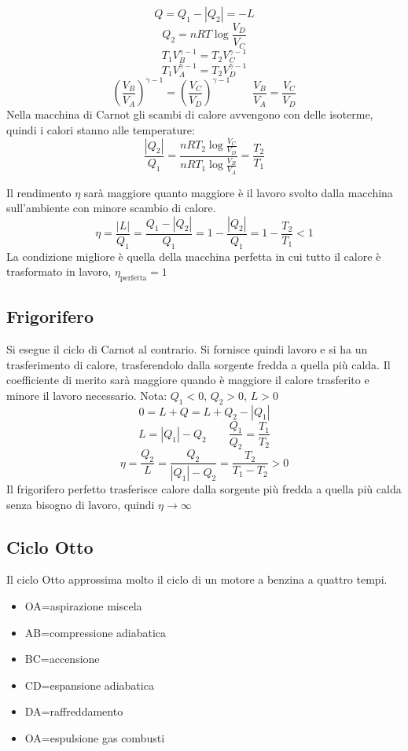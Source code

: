 \[Q=Q_1-|Q_2|=-L\]
\[Q_2=nRT\log\frac{V_D}{V_C}\]
\[T_1V_B^{\gamma-1}=T_2V_C^{\gamma-1}\]
\[T_1V_A^{\gamma-1}=T_2V_D^{\gamma-1}\]
\[\left(\frac{V_B}{V_A}\right)^{\gamma-1}=\left(\frac{V_C}{V_D}\right)^{\gamma-1}\qquad \frac{V_B}{V_A}=\frac{V_C}{V_D}\]
Nella macchina di Carnot gli scambi di calore avvengono con delle isoterme, quindi i calori stanno alle temperature:
\begin{equation}
 \frac{|Q_2|}{Q_1}=\frac{nRT_2\log\frac{V_C}{V_D}}{nRT_1\log\frac{V_B}{V_A}}=\frac{T_2}{T_1}
\end{equation}

Il rendimento $\eta$ sarà maggiore quanto maggiore è il lavoro svolto dalla macchina sull'ambiente con minore scambio di calore.
\[\eta=\frac{|L|}{Q_1}=\frac{Q_1-|Q_2|}{Q_1}=1-\frac{|Q_2|}{Q_1}=1-\frac{T_2}{T_1}<1\]
La condizione migliore è quella della macchina perfetta in cui tutto il calore è trasformato in lavoro, $\eta_\text{perfetta}= 1$

\subsection{Frigorifero}
Si esegue il ciclo di Carnot al contrario. Si fornisce quindi lavoro e si ha un trasferimento di calore, trasferendolo dalla sorgente fredda a quella più calda.
Il coefficiente di merito sarà maggiore quando è maggiore il calore trasferito e minore il lavoro necessario.
Nota: $Q_1<0$, $Q_2>0$, $L>0$
\[0=L+Q=L+Q_2-|Q_1|\]
\[L=|Q_1|-Q_2\qquad\frac{Q_1}{Q_2}=\frac{T_1}{T_2}\]
\[\eta=\frac{Q_2}{L}=\frac{Q_2}{|Q_1|-Q_2}=\frac{T_2}{T_1-T_2}>0\]
Il frigorifero perfetto trasferisce calore dalla sorgente più fredda a quella più calda senza bisogno di lavoro, quindi $\eta\rightarrow\infty$

\subsection{Ciclo Otto}
Il ciclo Otto approssima molto il ciclo di un motore a benzina a quattro tempi.
\begin{itemize}
\item[] OA=aspirazione miscela
\item[] AB=compressione adiabatica
\item[] BC=accensione
\item[] CD=espansione adiabatica
\item[] DA=raffreddamento
\item[] OA=espulsione gas combusti
\end{itemize}

